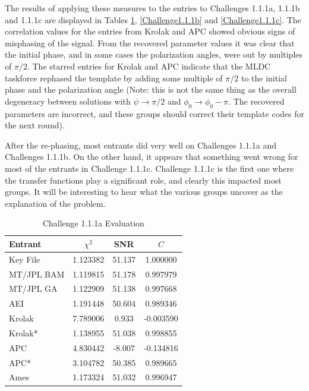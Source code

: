 \documentclass[11pt]{article}
\begin{document}
The results of applying these measures to the entries to Challenges 1.1.1a,
1.1.1b and 1.1.1c are displayed in Tables \ref{Challenge1.1.1a},
\ref{Challenge1.1.1b} and \ref{Challenge1.1.1c}. The correlation values
for the entries from Krolak and APC showed obvious signs of misphasing
of the signal. From the recovered parameter values it was clear that
the initial phase, and in some cases the polarization angles, were
out by multiples of $\pi/2$. The starred entries for Krolak and APC indicate that
the MLDC taskforce rephased the template by adding some multiple of
$\pi/2$ to the initial phase and the polarization angle (Note: this
is not the same thing as the overall degeneracy between solutions with
$\psi \rightarrow \pi/2$ and $\phi_0 \rightarrow \phi_0 - \pi$. The
recovered parameters are incorrect, and these groups should correct their
template codes for the next round).

After the re-phasing, most entrants did very well on Challenges 1.1.1a and
Challenges 1.1.1b. On the other hand, it appears that something went wrong
for most of the entrants in Challenge 1.1.1c. Challenge 1.1.1c is the
first one where the transfer functions play a significant role, and clearly
this impacted most groups. It will be interesting to hear what the various groups
uncover as the explanation of the problem.

\begin{table}[t]
\caption{\label{Challenge1.1.1a}Challenge 1.1.1a Evaluation}
\begin{center}
\begin{tabular}{|l|c|c|c|}
\hline
Entrant  & $\chi^2$ & SNR & $C$ \\
 \hline
Key File   & 1.123382 & 51.137 &  1.000000\\
MT/JPL BAM & 1.119815 & 51.178 &  0.997979 \\
MT/JPL GA  & 1.122909 & 51.138 &  0.997668 \\
AEI        & 1.191448 & 50.604 & 0.989346 \\
Krolak     & 7.789006 & 0.933 & -0.003590 \\
Krolak*   & 1.138955 & 51.038 & 0.998855 \\
APC       & 4.830442 & -8.007 & -0.134816 \\
APC*      & 3.104782 & 50.385 & 0.989665 \\
Ames      & 1.173324 & 51.032 & 0.996947 \\
\hline  
\end{tabular}
\end{center}
\end{table}
\end{document}
